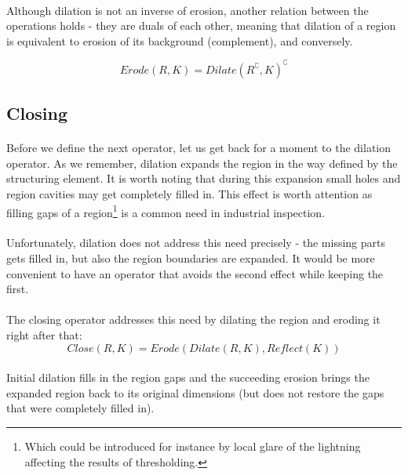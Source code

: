 \paragraph*{}
Although dilation is not an inverse of erosion, another relation between the operations holds - they are duals of each other, meaning that dilation of a region is equivalent to erosion of its background (complement), and conversely.

\[
	Erode(R, K) = Dilate(R^{\complement}, K)^{\complement}
\]

\subsection{Closing}

\paragraph*{}
Before we define the next operator, let us get back for a moment to the dilation operator. As we remember, dilation expands the region in the way defined by the structuring element. It is worth noting that during this expansion small holes and region cavities may get completely filled in. This effect is worth attention as filling gaps of a region\footnote{Which could be introduced for instance by local glare of the lightning affecting the results of thresholding.} is a common need in industrial inspection.

\paragraph*{}
Unfortunately, dilation does not address this need precisely - the missing parts gets filled in, but also the region boundaries are expanded. It would be more convenient to have an operator that avoids the second effect while keeping the first.

\paragraph*{}
The closing operator addresses this need by dilating the region and eroding it right after that:
\[
	Close(R,K) = Erode(Dilate(R, K), Reflect(K))
\] 

\paragraph*{}
Initial dilation fills in the region gaps and the succeeding erosion brings the expanded region back to its original dimensions (but does not restore the gaps that were completely filled in). 

